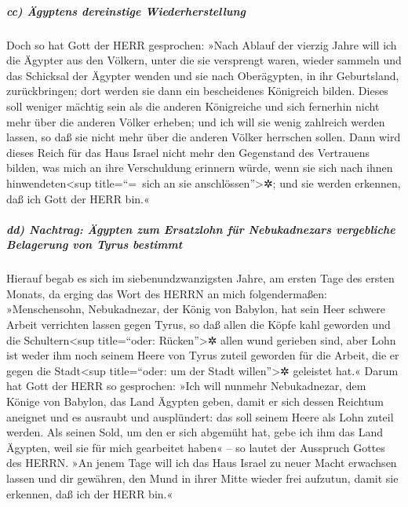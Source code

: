 \hypertarget{cc-uxe4gyptens-dereinstige-wiederherstellung}{%
\subparagraph{cc) Ägyptens dereinstige
Wiederherstellung}\label{cc-uxe4gyptens-dereinstige-wiederherstellung}}

Doch so hat Gott der HERR gesprochen: »Nach Ablauf der
vierzig Jahre will ich die Ägypter aus den Völkern, unter die sie
versprengt waren, wieder sammeln und das Schicksal der
Ägypter wenden und sie nach Oberägypten, in ihr Geburtsland,
zurückbringen; dort werden sie dann ein bescheidenes Königreich bilden.
Dieses soll weniger mächtig sein als die anderen
Königreiche und sich fernerhin nicht mehr über die anderen Völker
erheben; und ich will sie wenig zahlreich werden lassen, so daß sie
nicht mehr über die anderen Völker herrschen sollen. Dann
wird dieses Reich für das Haus Israel nicht mehr den Gegenstand des
Vertrauens bilden, was mich an ihre Verschuldung erinnern würde, wenn
sie sich nach ihnen hinwendeten\textless sup title=``=~sich an sie
anschlössen''\textgreater✲; und sie werden erkennen, daß ich Gott der
HERR bin.«

\hypertarget{dd-nachtrag-uxe4gypten-zum-ersatzlohn-fuxfcr-nebukadnezars-vergebliche-belagerung-von-tyrus-bestimmt}{%
\subparagraph{dd) Nachtrag: Ägypten zum Ersatzlohn für Nebukadnezars
vergebliche Belagerung von Tyrus
bestimmt}\label{dd-nachtrag-uxe4gypten-zum-ersatzlohn-fuxfcr-nebukadnezars-vergebliche-belagerung-von-tyrus-bestimmt}}

Hierauf begab es sich im siebenundzwanzigsten Jahre, am
ersten Tage des ersten Monats, da erging das Wort des HERRN an mich
folgendermaßen: »Menschensohn, Nebukadnezar, der König
von Babylon, hat sein Heer schwere Arbeit verrichten lassen gegen Tyrus,
so daß allen die Köpfe kahl geworden und die Schultern\textless sup
title=``oder: Rücken''\textgreater✲ allen wund gerieben sind, aber Lohn
ist weder ihm noch seinem Heere von Tyrus zuteil geworden für die
Arbeit, die er gegen die Stadt\textless sup title=``oder: um der Stadt
willen''\textgreater✲ geleistet hat.« Darum hat Gott der
HERR so gesprochen: »Ich will nunmehr Nebukadnezar, dem Könige von
Babylon, das Land Ägypten geben, damit er sich dessen Reichtum aneignet
und es ausraubt und ausplündert: das soll seinem Heere als Lohn zuteil
werden. Als seinen Sold, um den er sich abgemüht hat,
gebe ich ihm das Land Ägypten, weil sie für mich gearbeitet haben« -- so
lautet der Ausspruch Gottes des HERRN. »An jenem Tage
will ich das Haus Israel zu neuer Macht erwachsen lassen und dir
gewähren, den Mund in ihrer Mitte wieder frei aufzutun, damit sie
erkennen, daß ich der HERR bin.«

